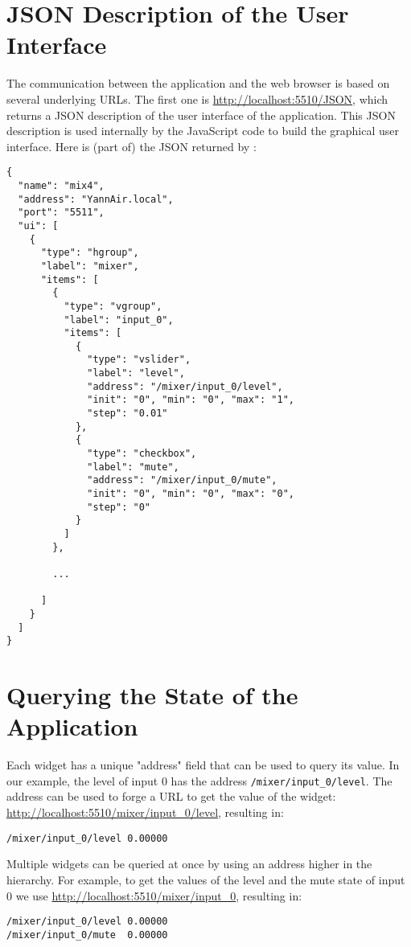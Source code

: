 \section{JSON Description of the User Interface}
The communication between the application and the web browser is based on several underlying URLs. The first one is \url{http://localhost:5510/JSON}, which returns a JSON description of the user interface of the application. This JSON description is used internally by the JavaScript code to build the graphical user interface. Here is (part of) the JSON returned by :
\begin{lstlisting}
{
  "name": "mix4",
  "address": "YannAir.local",
  "port": "5511",
  "ui": [
    {
      "type": "hgroup",
      "label": "mixer",
      "items": [
        {
          "type": "vgroup",
          "label": "input_0",
          "items": [
            {
              "type": "vslider",
              "label": "level",
              "address": "/mixer/input_0/level",
              "init": "0", "min": "0", "max": "1", 
              "step": "0.01"
            },
            {
              "type": "checkbox",
              "label": "mute",
              "address": "/mixer/input_0/mute",
              "init": "0", "min": "0", "max": "0", 
              "step": "0"
            }
          ]
        },
        
        ...
        
      ]
    }
  ]
}
\end{lstlisting}

\section{Querying the State of the Application}

Each widget has a unique "address" field that can be used to query its value. In our example, the level of input 0 has the address \lstinline'/mixer/input_0/level'. The address can be used to forge a URL to get the value of the widget: \url{http://localhost:5510/mixer/input_0/level}, resulting in:
\begin{lstlisting}
/mixer/input_0/level 0.00000  
\end{lstlisting}

Multiple widgets can be queried at once by using an address higher in the hierarchy. For example, to get the values of the level and the mute state of input 0 we use \url{http://localhost:5510/mixer/input_0}, resulting in:
\begin{lstlisting}
/mixer/input_0/level 0.00000 
/mixer/input_0/mute  0.00000 
\end{lstlisting}

